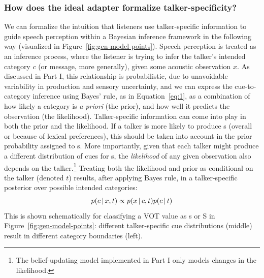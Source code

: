 \subsubsection{How does the ideal adapter formalize talker-specificity?}
\label{sec:how-does-ideal-adapter-talker-spec}

We can formalize the intuition that listeners use talker-specific information to guide speech perception within a Bayesian inference framework in the following way (visualized in Figure~\ref{fig:gen-model-points}).  Speech perception is treated as an inference process, where the listener is trying to infer the talker's intended category $c$ (or message, more generally), given some acoustic observation $x$.  As discussed in Part I, this relationship is probabilistic, due to unavoidable variability in production and sensory uncertainty, and we can express the cue-to-category inference using Bayes' rule, as in Equation~\eqref{eq:1}, as a combination of how likely a category is \emph{a priori} (the prior), and how well it predicts the observation (the likelihood).  Talker-specific information can come into play in both the prior and the likelihood.  If a talker is more likely to produce \ph s (overall or because of lexical preferences), this should be taken into account in the prior probability assigned to \ph s.  More importantly, given that each talker might produce a different distribution of cues for \ph s, the \emph{likelihood} of any given observation also depends on the talker.\footnote{The belief-updating model implemented in Part I only models changes in the likelihood.} Treating both the likelihood and prior as conditional on the talker (denoted $t$) results, after applying Bayes rule, in a talker-specific posterior over possible intended categories: 
\begin{equation}
  \label{eq:23}
  p(c \,|\, x, t) \propto p(x \,|\, c, t) p(c \,|\, t)
\end{equation}
This is shown schematically for classifying a VOT value as \ph s or \ph S in Figure~\ref{fig:gen-model-points}: different talker-specific cue distributions (middle) result in different category boundaries (left).

